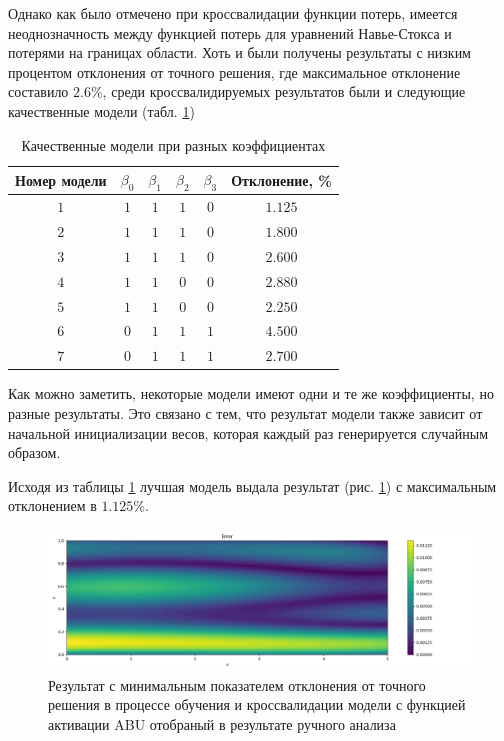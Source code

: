 Однако как было отмечено при кроссвалидации функции потерь, имеется неоднозначность между
функцией потерь для уравнений Навье-Стокса и потерями на границах области. Хоть и были
получены результаты с низким процентом отклонения от точного решения, где максимальное
отклонение составило $2.6\%$, среди кроссвалидируемых результатов были и следующие
качественные модели (табл. \ref{table:couette_abu_best_models})

\begin{table}[ht]
    \centering
    \caption{Качественные модели при разных коэффициентах}
    \begin{tabular}{ |c|c|c|c|c|c| } 
        \hline
        Номер модели & $\beta_0$ & $\beta_1$ & $\beta_2$ & $\beta_3$ & Отклонение, \% \\
        \hline
        $1$ & $1$ & $1$ & $1$ & $0$ & $1.125$ \\ 
        \hline
        $2$ & $1$ & $1$ & $1$ & $0$ & $1.800$ \\ 
        \hline
        $3$ & $1$ & $1$ & $1$ & $0$ & $2.600$ \\ 
        \hline
        $4$ & $1$ & $1$ & $0$ & $0$ & $2.880$ \\ 
        \hline
        $5$ & $1$ & $1$ & $0$ & $0$ & $2.250$ \\ 
        \hline
        $6$ & $0$ & $1$ & $1$ & $1$ & $4.500$ \\ 
        \hline
        $7$ & $0$ & $1$ & $1$ & $1$ & $2.700$ \\ 
        \hline
    \end{tabular}
    \label{table:couette_abu_best_models}
\end{table}

Как можно заметить, некоторые модели имеют одни и те же коэффициенты, но
разные результаты. Это связано с тем, что результат модели также 
зависит от начальной инициализации весов, которая каждый раз
генерируется случайным образом.

Исходя из таблицы \ref{table:couette_abu_best_models} лучшая модель
выдала результат (рис. \ref{fig:couette_abu_best_model}) с максимальным отклонением в $1.125\%$.

\begin{figure}[ht]
    \includegraphics{data/couette_abu_error_best_model.png}
    \caption{Результат с минимальным показателем отклонения от точного решения в процессе обучения и
    кроссвалидации модели с функцией активации ABU отобраный в результате ручного анализа}
    \label{fig:couette_abu_best_model}
\end{figure}

